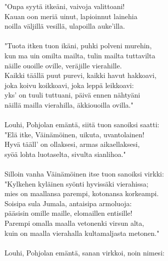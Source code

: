 "Onpa syytä itkeäni, vaivoja valittoani!                  \\
Kauan oon meriä uinut, lapioinnut lainehia                \\
noilla väljillä vesillä, ulapoilla auke'illa.             \\
                                                          \\
"Tuota itken tuon ikäni, puhki polveni murehin,           \\
kun ma uin omilta mailta, tulin mailta tuttavilta         \\
näille ouoille oville, veräjille vierahille.              \\
Kaikki täällä puut purevi, kaikki havut hakkoavi,         \\
joka koivu koikkoavi, joka leppä leikkoavi:               \\
yks' on tuuli tuttuani, päivä ennen nähtyäni              \\
näillä mailla vierahilla, äkkiouoilla ovilla."            \\
                                                          \\
Louhi, Pohjolan emäntä, siitä tuon sanoiksi saatti:       \\
"Elä itke, Väinämöinen, uikuta, uvantolainen!             \\
Hyvä tääll' on ollaksesi, armas aikaellaksesi,            \\
syöä lohta luotaselta, sivulta sianlihoa."                \\
                                                          \\
Silloin vanha Väinämöinen itse tuon sanoiksi virkki:      \\
"Kylkehen kyläinen syönti hyvissäki vierahissa;           \\
mies on maallansa parempi, kotonansa korkeampi.           \\
Soisipa sula Jumala, antaisipa armoluoja:                 \\
pääsisin omille maille, elomaillen entisille!             \\
Parempi omalla maalla vetonenki virsun alta,              \\
kuin on maalla vierahalla kultamaljasta metonen."         \\
                                                          \\
Louhi, Pohjolan emäntä, sanan virkkoi, noin nimesi:       \\
